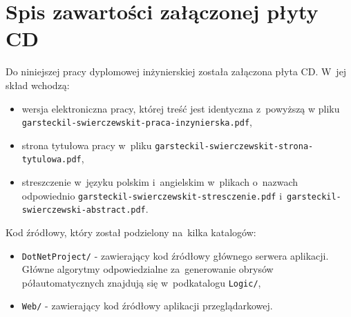 \documentclass[a4paper,11pt,twoside,openright]{report}
\newcommand\blankpage{%
    \null
    \thispagestyle{empty}%
    \newpage}
\theoremstyle{definition}
\begin{document}



\listoffigures
{}






\chapter*{Spis zawartości załączonej płyty CD}

Do niniejszej pracy dyplomowej inżynierskiej została załączona płyta CD. W~jej skład wchodzą:
\begin{itemize}[noitemsep]
\item wersja elektroniczna pracy, której treść jest identyczna z~powyższą w
pliku \verb+garsteckil-swierczewskit-praca-inzynierska.pdf+,
\item strona tytułowa pracy w~pliku \verb+garsteckil-swierczewskit-strona-tytulowa.pdf+,
\item streszczenie w~języku polskim i~angielskim w~plikach o~nazwach odpowiednio
\verb+garsteckil-swierczewskit-stresczenie.pdf+ i~\verb+garsteckil-swierczewski-abstract.pdf+.
\end{itemize}

Kod źródłowy, który został podzielony na~kilka katalogów:
\begin{itemize}
\item \verb+DotNetProject/+ - zawierający kod źródłowy głównego serwera aplikacji.
Główne algorytmy odpowiedzialne za~generowanie obrysów półautomatycznych znajdują się w~podkatalogu \verb+Logic/+,
\item \verb+Web/+ - zawierający kod źródłowy aplikacji przeglądarkowej.
\end{itemize}

\afterpage{\blankpage}

\end{document}
